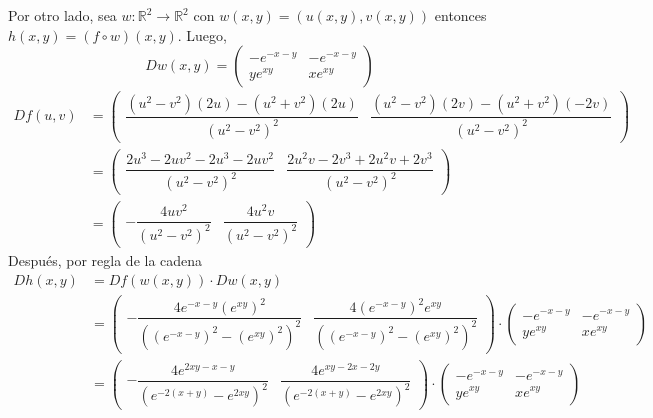 \documentclass[fleqn]{article}
\begin{document}
\begin{enumerate}
        Por otro lado, sea $ w: \mathbb{R}^2 \to \mathbb{R}^2 $ con $ w(x,y) = (u(x,y), v(x,y)) $ entonces $ h(x,y) = (f \circ w)(x,y) $. Luego,
        \begin{equation*}
            Dw(x,y) = \left(
                \begin{matrix}
                    -e^{-x - y} & -e^{-x - y} \\
                    y e^{xy}    & x e^{xy}
                \end{matrix}
            \right)
        \end{equation*}
        \begin{align*}
            Df(u,v) &= \left( \begin{matrix} \dfrac{(u^2 - v^2)(2u) - (u^2 + v^2)(2u)}{(u^2 - v^2)^2} & \dfrac{(u^2 - v^2)(2v) - (u^2 + v^2)(-2v)}{(u^2 - v^2)^2} \end{matrix} \right) \\
            &= \left( \begin{matrix} \dfrac{2u^3 - 2u v^2 - 2u^3 - 2u v^2}{(u^2 - v^2)^2} & \dfrac{2u^2 v - 2v^3 + 2u^2 v + 2v^3}{(u^2 - v^2)^2} \end{matrix} \right) \\
            &= \left( \begin{matrix} - \dfrac{4u v^2}{(u^2 - v^2)^2} & \dfrac{4u^2 v}{(u^2 - v^2)^2} \end{matrix} \right)
        \end{align*}
        Después, por regla de la cadena
        \begin{align*}
            Dh(x,y) &= Df(w(x,y)) \cdot Dw(x,y) \\
            &= \left( \begin{matrix} - \dfrac{4 e^{-x - y} (e^{xy})^2}{((e^{-x - y})^2 - (e^{xy})^2)^2} & \dfrac{4 (e^{-x - y})^2 e^{xy}}{((e^{-x - y})^2 - (e^{xy})^2)^2} \end{matrix} \right) \cdot \left(\begin{matrix} -e^{-x - y} & -e^{-x - y} \\ y e^{xy} & x e^{xy} \end{matrix} \right) \\
            &= \left( \begin{matrix} - \dfrac{4 e^{2xy - x - y}}{(e^{-2(x + y)} - e^{2xy})^2} & \dfrac{4 e^{xy - 2x - 2y}}{(e^{-2(x + y)} - e^{2xy})^2} \end{matrix} \right) \cdot \left(\begin{matrix} -e^{-x - y} & -e^{-x - y} \\ y e^{xy} & x e^{xy} \end{matrix} \right) \\

\end{align*}
\end{enumerate}
\end{document}
